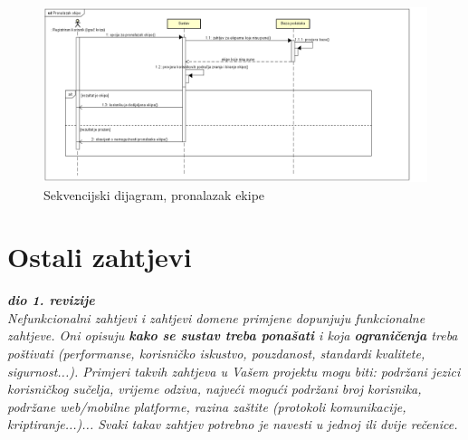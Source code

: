 				\begin{figure}[H]
					\includegraphics[width=\textwidth]{dijagrami/SeqDiagram3.PNG} 
					\caption{Sekvencijski dijagram, pronalazak ekipe}
					\label{fig:SeqDiagram3}
				\end{figure}
				
				\eject

	
		\section{Ostali zahtjevi}
		
			\textbf{\textit{dio 1. revizije}}\\
		 
			 \textit{Nefunkcionalni zahtjevi i zahtjevi domene primjene dopunjuju funkcionalne zahtjeve. Oni opisuju \textbf{kako se sustav treba ponašati} i koja \textbf{ograničenja} treba poštivati (performanse, korisničko iskustvo, pouzdanost, standardi kvalitete, sigurnost...). Primjeri takvih zahtjeva u Vašem projektu mogu biti: podržani jezici korisničkog sučelja, vrijeme odziva, najveći mogući podržani broj korisnika, podržane web/mobilne platforme, razina zaštite (protokoli komunikacije, kriptiranje...)... Svaki takav zahtjev potrebno je navesti u jednoj ili dvije rečenice.}
			 
			 
			 
	